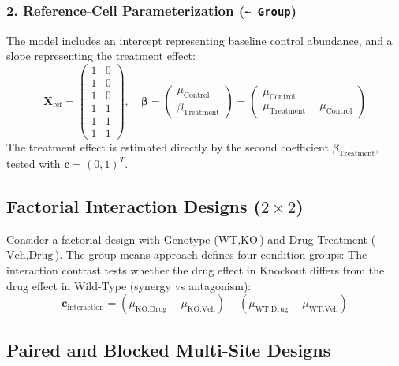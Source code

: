 \documentclass[11pt,twoside,openright]{book}
\begin{document}
\subsubsection{2. Reference-Cell Parameterization (\texttt{\~{} Group})}
The model includes an intercept representing baseline control abundance, and a slope representing the treatment effect:
\begin{equation}
\mathbf{X}_{\text{ref}} = \begin{pmatrix}
1 & 0 \\
1 & 0 \\
1 & 0 \\
1 & 1 \\
1 & 1 \\
1 & 1
\end{pmatrix}, \quad 
\boldsymbol{\beta} = \begin{pmatrix} \mu_{\text{Control}} \\ \beta_{\text{Treatment}} \end{pmatrix} = \begin{pmatrix} \mu_{\text{Control}} \\ \mu_{\text{Treatment}} - \mu_{\text{Control}} \end{pmatrix}
\end{equation}
The treatment effect is estimated directly by the second coefficient $\beta_{\text{Treatment}}$, tested with $\mathbf{c} = (0, 1)^T$.

\subsection{Factorial Interaction Designs \texorpdfstring{($2 \times 2$)}{(2x2)}}

Consider a factorial design with Genotype ($\text{WT}, \text{KO}$) and Drug Treatment ($\text{Veh}, \text{Drug}$). The group-means approach defines four condition groups:
The interaction contrast tests whether the drug effect in Knockout differs from the drug effect in Wild-Type (synergy vs antagonism):
\begin{equation}
\mathbf{c}_{\text{interaction}} = (\mu_{\text{KO.Drug}} - \mu_{\text{KO.Veh}}) - (\mu_{\text{WT.Drug}} - \mu_{\text{WT.Veh}})
\end{equation}

\subsection{Paired and Blocked Multi-Site Designs}
\end{document}
